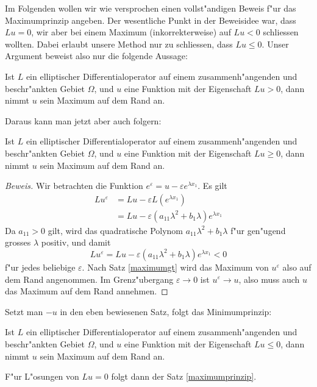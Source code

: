 {\small
Im Folgenden wollen wir wie versprochen einen vollst"andigen Beweis f"ur das
Maximumprinzip angeben. Der wesentliche Punkt in der Beweisidee
war, dass $Lu=0$, wir aber bei einem Maximum (inkorrekterweise)
auf $Lu<0$ schliessen wollten. Dabei erlaubt unsere Method nur zu
schliessen, dass $Lu\le 0$.
Unser Argument beweist also nur die folgende Aussage:
\begin{satz}
\label{maximumgt}
Ist $L$ ein elliptischer Differentialoperator auf einem zusammenh"angenden
und beschr"ankten Gebiet $\Omega$,
und $u$ eine Funktion mit der Eigenschaft $Lu>0$,
dann nimmt $u$ sein Maximum auf dem Rand an.
\end{satz}

Daraus kann man jetzt aber auch folgern:
\begin{satz}
Ist $L$ ein elliptischer Differentialoperator auf einem zusammenh"angenden
und beschr"ankten Gebiet $\Omega$,
und $u$ eine Funktion mit der Eigenschaft $Lu\ge0$,
dann nimmt $u$ sein Maximum auf dem Rand an.
\end{satz}

\begin{proof}[Beweis]
Wir betrachten die Funktion $e^{\varepsilon}=u-\varepsilon e^{\lambda x_1}$.
Es gilt
\begin{align*}
Lu^{\varepsilon}&=Lu-\varepsilon L(e^{\lambda x_1})\\
&=Lu-\varepsilon(a_{11}\lambda^2+b_1\lambda)e^{\lambda x_1}
\end{align*}
Da $a_{11}>0$ gilt, wird das quadratische Polynom $a_{11}\lambda^2+b_1\lambda$
f"ur gen"ugend grosses $\lambda$ positiv, und damit 
\[
Lu^{\varepsilon}= Lu-\varepsilon(a_{11}\lambda^2+b_1\lambda)e^{\lambda x_1}<0
\]
f"ur jedes beliebige $\varepsilon$. Nach Satz \ref{maximumgt} wird das Maximum
von $u^\varepsilon$ also auf dem Rand angenommen.
Im Grenz"ubergang $\varepsilon\to 0$ ist $u^\varepsilon\to u$, also
muss auch $u$ das Maximum auf dem Rand annehmen.
\end{proof}

Setzt man $-u$ in den eben bewiesenen Satz, folgt das Minimumprinzip:
\begin{satz}
Ist $L$ ein elliptischer Differentialoperator auf einem zusammenh"angenden
und beschr"ankten Gebiet $\Omega$,
und $u$ eine Funktion mit der Eigenschaft $Lu\le0$,
dann nimmt $u$ sein Maximum auf dem Rand an.
\end{satz}

F"ur L"osungen von $Lu=0$ folgt dann der Satz \ref{maximumprinzip}.
}


